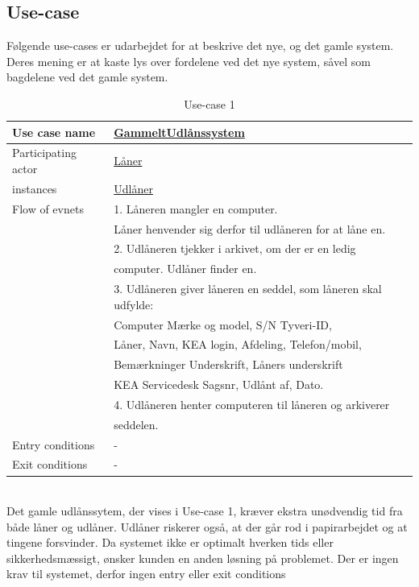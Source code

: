 \documentclass[a4paper]{article}
\begin{document}
\subsection{Use-case}
Følgende use-cases er udarbejdet for at beskrive det nye, og det gamle system. Deres mening er at kaste lys over fordelene ved det nye system, såvel som bagdelene ved det gamle system. \\
\begin{table}[h]
\caption{Use-case 1}
\begin{tabular}{ll}
Use case name                 & \underline{GammeltUdlånssystem} \\ \hline
Participating actor           & \underline{Låner} \\
instances                     & \underline{Udlåner} \\ \hline
Flow of evnets                & 1. Låneren mangler en computer.\\& Låner henvender sig derfor til udlåneren for at låne en.
\\& 2. Udlåneren tjekker i arkivet, om der er en ledig \\& computer. Udlåner finder en.
\\& 3. Udlåneren giver låneren en seddel, som låneren skal udfylde: \\& Computer Mærke og model, S/N Tyveri-ID, \\& Låner, Navn, KEA login, Afdeling, Telefon/mobil, \\& Bemærkninger Underskrift, Låners underskrift \\& KEA Servicedesk Sagsnr, Udlånt af, Dato.
\\& 4. Udlåneren henter computeren til låneren og arkiverer
\\& seddelen.\\ \hline
Entry conditions & - \\ \hline
Exit conditions  & -
\end{tabular}
\end{table} \\
Det gamle udlånssytem, der vises i Use-case 1, kræver ekstra unødvendig tid fra både låner og udlåner. Udlåner riskerer også, at der går rod i papirarbejdet og at tingene forsvinder. Da systemet ikke er optimalt hverken tids eller sikkerhedsmæssigt, ønsker kunden en anden løsning på problemet. Der er ingen krav til systemet, derfor ingen entry eller exit conditions \\
\end{document}
